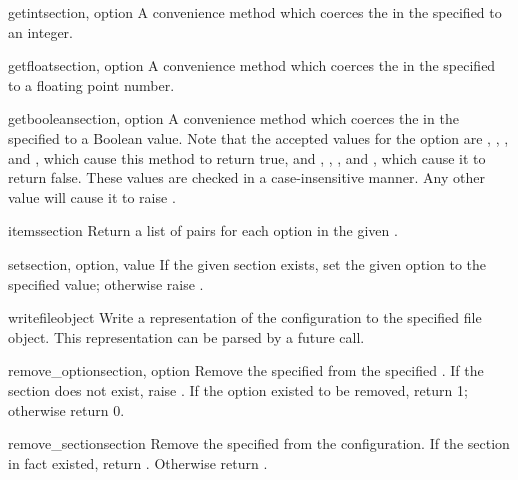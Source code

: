 \begin{methoddesc}{getint}{section, option}
A convenience method which coerces the  in the specified
 to an integer.
\end{methoddesc}

\begin{methoddesc}{getfloat}{section, option}
A convenience method which coerces the  in the specified
 to a floating point number.
\end{methoddesc}

\begin{methoddesc}{getboolean}{section, option}
A convenience method which coerces the  in the specified
 to a Boolean value.  Note that the accepted values
for the option are , , , and ,
which cause this method to return true, and , ,
, and , which cause it to return false.  These
values are checked in a case-insensitive manner.  Any other value will
cause it to raise .
\end{methoddesc}

\begin{methoddesc}{items}{section}
Return a list of  pairs for each
option in the given .
\end{methoddesc}

\begin{methoddesc}{set}{section, option, value}
If the given section exists, set the given option to the specified value;
otherwise raise .
\end{methoddesc}

\begin{methoddesc}{write}{fileobject}
Write a representation of the configuration to the specified file
object.  This representation can be parsed by a future 
call.
\end{methoddesc}

\begin{methoddesc}{remove_option}{section, option}
Remove the specified  from the specified .
If the section does not exist, raise . 
If the option existed to be removed, return 1; otherwise return 0.
\end{methoddesc}

\begin{methoddesc}{remove_section}{section}
Remove the specified  from the configuration.
If the section in fact existed, return .
Otherwise return .
\end{methoddesc}

